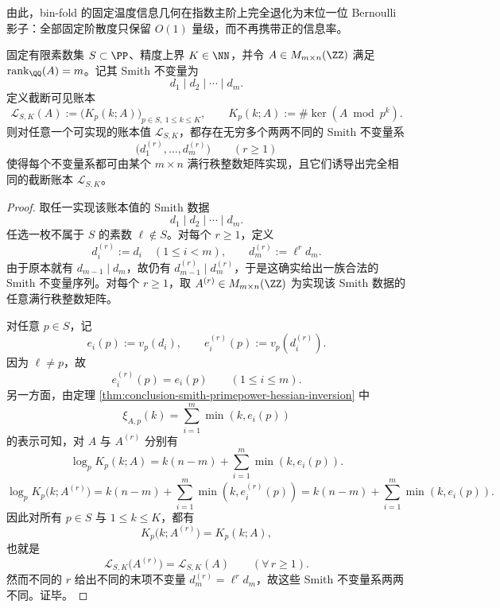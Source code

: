 \noindent
由此，bin-fold 的固定温度信息几何在指数主阶上完全退化为末位一位 Bernoulli 影子：全部固定阶散度只保留 \(O(1)\) 量级，而不再携带正的信息率。

\begin{theorem}\label{thm:conclusion-truncated-smith-ledger-infinite-indistinguishability}
固定有限素数集 \(S\subset\PP\)、精度上界 \(K\in\NN\)，并令 \(A\in M_{m\times n}(\ZZ)\) 满足 \(\operatorname{rank}_{\QQ}(A)=m\)。记其 Smith 不变量为
\[
d_1\mid d_2\mid\cdots\mid d_m.
\]
定义截断可见账本
\[
\mathcal L_{S,K}(A)
:=
\bigl(K_p(k;A)\bigr)_{p\in S,\ 1\le k\le K},
\qquad
K_p(k;A):=\#\ker(A\bmod p^k).
\]
则对任意一个可实现的账本值 \(\mathcal L_{S,K}\)，都存在无穷多个两两不同的 Smith 不变量系
\[
\bigl(d_1^{(r)},\dots,d_m^{(r)}\bigr)\qquad(r\ge 1)
\]
使得每个不变量系都可由某个 \(m\times n\) 满行秩整数矩阵实现，且它们诱导出完全相同的截断账本 \(\mathcal L_{S,K}\)。
\end{theorem}
\begin{proof}
取任一实现该账本值的 Smith 数据
\[
d_1\mid d_2\mid\cdots\mid d_m.
\]
任选一枚不属于 \(S\) 的素数 \(\ell\notin S\)。对每个 \(r\ge 1\)，定义
\[
d_i^{(r)}:=d_i\quad(1\le i<m),
\qquad
d_m^{(r)}:=\ell^r d_m.
\]
由于原本就有 \(d_{m-1}\mid d_m\)，故仍有
\(
d_{m-1}^{(r)}\mid d_m^{(r)}
\)，于是这确实给出一族合法的 Smith 不变量序列。对每个 \(r\ge 1\)，取 \(A^{(r)}\in M_{m\times n}(\ZZ)\) 为实现该 Smith 数据的任意满行秩整数矩阵。

对任意 \(p\in S\)，记
\[
e_i(p):=v_p(d_i),
\qquad
e_i^{(r)}(p):=v_p(d_i^{(r)}).
\]
因为 \(\ell\neq p\)，故
\[
e_i^{(r)}(p)=e_i(p)\qquad(1\le i\le m).
\]
另一方面，由定理 \ref{thm:conclusion-smith-primepower-hessian-inversion} 中
\[
\xi_{A,p}(k)=\sum_{i=1}^{m}\min(k,e_i(p))
\]
的表示可知，对 \(A\) 与 \(A^{(r)}\) 分别有
\[
\log_p K_p(k;A)=k(n-m)+\sum_{i=1}^{m}\min(k,e_i(p)).
\]
\[
 \log_p K_p\bigl(k;A^{(r)}\bigr)
 =
 k(n-m)+\sum_{i=1}^{m}\min(k,e_i^{(r)}(p))
 =
 k(n-m)+\sum_{i=1}^{m}\min(k,e_i(p)).
 \]
因此对所有 \(p\in S\) 与 \(1\le k\le K\)，都有
\[
K_p\bigl(k;A^{(r)}\bigr)=K_p(k;A),
\]
也就是
\[
\mathcal L_{S,K}\bigl(A^{(r)}\bigr)=\mathcal L_{S,K}(A)
\qquad(\forall\,r\ge 1).
\]
然而不同的 \(r\) 给出不同的末项不变量 \(d_m^{(r)}=\ell^r d_m\)，故这些 Smith 不变量系两两不同。证毕。
\end{proof}

